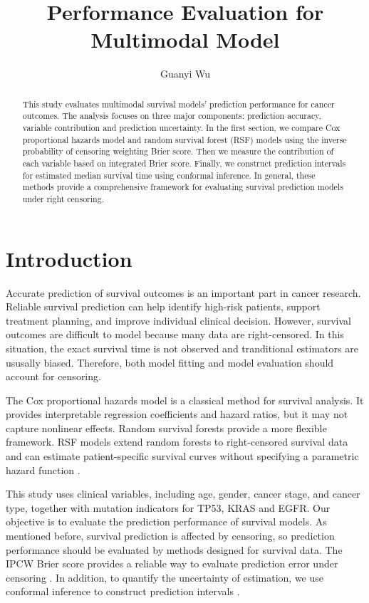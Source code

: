 \documentclass[11pt]{article}
\title{Performance Evaluation for Multimodal Model}
\author{Guanyi Wu}
\date{}
\begin{document}
\maketitle

\begin{abstract}
This study evaluates multimodal survival models' prediction performance for cancer outcomes. The analysis focuses on three major components: prediction accuracy, variable contribution and prediction uncertainty. In the first section, we compare Cox proportional hazards model and random survival forest (RSF) models using the inverse probability of censoring weighting Brier score. Then we  measure the contribution of each variable based on integrated Brier score. Finally, we construct prediction intervals for estimated median survival time using conformal inference. In general, these methods provide a comprehensive framework for evaluating survival prediction models under right censoring.
\end{abstract}

\section{Introduction}

Accurate prediction of survival outcomes is an important part in cancer research. Reliable survival prediction can help identify high-risk patients, support treatment planning, and improve individual clinical decision. However, survival outcomes are difficult to model because many data are right-censored. In this situation, the exact survival time is not observed and tranditional estimators are ususally biased. Therefore, both model fitting and model evaluation should account for censoring.

The Cox proportional hazards model is a classical method for survival analysis. It provides interpretable regression coefficients and hazard ratios, but it may not capture nonlinear effects. Random survival forests provide a more flexible framework. RSF models extend random forests to right-censored survival data and can estimate patient-specific survival curves without specifying a parametric hazard function \citep{ishwaran2008random}.

This study uses clinical variables, including age, gender, cancer stage, and cancer type, together with mutation indicators for TP53, KRAS and EGFR. Our objective is to evaluate the prediction performance of survival models. As mentioned before, survival prediction is affected by censoring, so prediction performance should be evaluated by methods designed for survival data. The IPCW Brier score provides a reliable way to evaluate prediction error under censoring \citep{gerds2006consistent}. In addition, to quantify the uncertainty of estimation, we use conformal inference  to construct prediction intervals \citep{lei2018distribution}.
\end{document}
